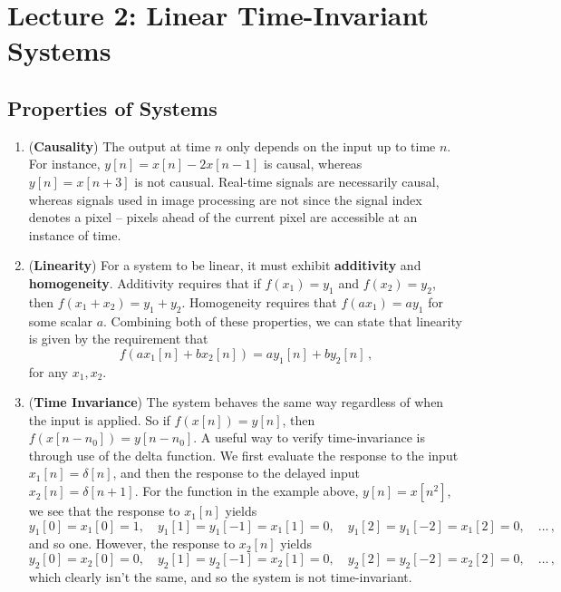 \section{Lecture 2: Linear Time-Invariant Systems}

\subsection{Properties of Systems}
%
\begin{enumerate}
\item (\textbf{Causality})
  The output at time $n$ only depends on the input up to time $n$. For instance,
  $y[n] = x[n] - 2x[n-1]$ is causal, whereas $y[n] = x[n+3]$ is not causual.
  Real-time signals are necessarily causal, whereas signals used in image processing
  are not since the signal index denotes a pixel -- pixels ahead of the current
  pixel are accessible at an instance of time.

\item (\textbf{Linearity})
  For a system to be linear, it must exhibit \textbf{additivity} and
  \textbf{homogeneity}. Additivity requires that if $f(x_1) = y_1$ and
  $f(x_2) = y_2$, then $f(x_1 + x_2) = y_1 + y_2$. Homogeneity requires that
  $f(ax_1) = ay_1$ for some scalar $a$. Combining both of these properties, we can
  state that linearity is given by the requirement that
  \begin{displaymath}
    f(ax_1[n] + bx_2[n]) = ay_1[n] + by_2[n] \,,
  \end{displaymath}
  for any $x_1,x_2$.

\item (\textbf{Time Invariance})
  The system behaves the same way regardless of when the input is applied. So if
  $f(x[n]) = y[n]$, then $f(x[n-n_0]) = y[n-n_0]$.
  A useful way to verify time-invariance is through use of the delta function. We first evaluate
  the response to the input $x_1[n] = \delta[n]$, and then the response to the delayed input
  $x_2[n] = \delta[n+1]$. For the function in the example above, $y[n] = x[n^2]$, we see that
  the response to $x_1[n]$ yields
  \begin{displaymath}
    y_1[0] = x_1[0] = 1,\quad y_1[1] = y_1[-1] = x_1[1] = 0,\quad y_1[2] = y_1[-2] = x_1[2] = 0,\quad \hdots \,,
  \end{displaymath}
  and so one. However, the response to $x_2[n]$ yields
  \begin{displaymath}
    y_2[0] = x_2[0] = 0,\quad y_2[1] = y_2[-1] = x_2[1] = 0,\quad y_2[2] = y_2[-2] = x_2[2] = 0,\quad \hdots \,,
  \end{displaymath}
  which clearly isn't the same, and so the system is not time-invariant.
\end{enumerate}

